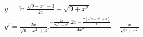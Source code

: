 \begin{ex}
\begin{align}
&y=\ln{\frac{\sqrt{9-x^2}+3}{2x}}-\sqrt{9+x^2}\nonumber\\
&y'=\frac{2x}{\sqrt{9-x^2}+3}.\frac{-\frac{2x}{2\sqrt{9-x^2}}.2x-\frac{2(\sqrt{9-x^2}+3)}{1}}{4x^2}-\frac{x}{\sqrt{9+x^2}}\nonumber
\end{align}
\end{ex}
